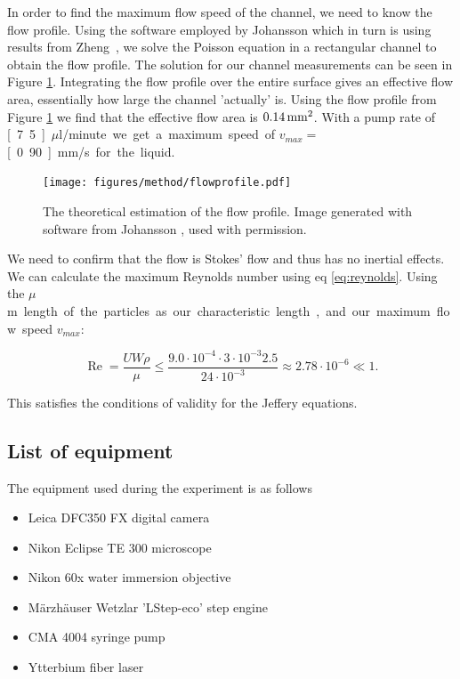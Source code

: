 In order to find the maximum flow speed of the channel, we need to know the flow profile. Using the software employed by Johansson \cite{AntonThesis} which in turn is using results from Zheng~\cite{flowprofile}, we solve the Poisson equation in a rectangular channel to obtain the flow profile. The solution for our channel measurements can be seen in Figure \ref{fig:flowprofile}. 
Integrating the flow profile over the entire surface gives an effective flow area, essentially how large the channel 'actually' is. 
Using the flow profile from Figure \ref{fig:flowprofile} we find that the effective flow area is $\unit[0.14]{mm^2}$. With a pump rate of \unit[7.5]{$\mu$l/minute} we get a maximum speed of $v_{max} =$\unit[0.90]{mm/s} for the liquid.



\begin{figure}[H]
\begin{center}
\texttt{[image: figures/method/flowprofile.pdf]}
\end{center}
\caption{The theoretical estimation of the flow profile. Image generated with software from Johansson \cite{AntonThesis}, used with permission.}
\label{fig:flowprofile}
\end{figure}

\noindent We need to confirm that the flow is Stokes' flow and thus has no inertial effects. We can calculate the maximum Reynolds number using eq \ref{eq:reynolds}. Using the \unit[3]{$\mu$m} length of the particles as our characteristic length, and our maximum flow speed $v_{max}$:

\begin{equation}
\operatorname{Re} = \frac{U W \rho}{\mu} 
\leq \frac{9.0\cdot 10^{-4} \cdot 3 \cdot 10^{-3} 2.5 }{24 \cdot 10^{-3}} 
\approx	 2.78  \cdot 10^{-6} \ll 1.
\end{equation}

\noindent This satisfies the conditions of validity for the Jeffery equations. 



\subsection{List of equipment}
 The equipment used during the experiment is as follows
\begin{itemize}
\item Leica DFC350 FX digital camera 
\item Nikon Eclipse TE 300 microscope
\item Nikon 60x water immersion objective
\item Märzhäuser Wetzlar 'LStep-eco' step engine
\item CMA 4004 syringe pump
\item Ytterbium fiber laser  %
\end{itemize}

